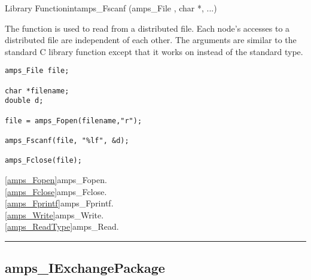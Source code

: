 \begin{deftypefn}{Library Function}{int}{amps\_Fscanf}
(amps_File , char *, ...)

\DESCRIPTION

The function  is used to read from a distributed file.
Each node's accesses to a distributed file are independent of each
other.  The arguments are similar to the standard C library function
 except that it works on  instead of the
standard  type.

\EXAMPLE

\begin{display}\begin{verbatim}
amps_File file;

char *filename;
double d;

file = amps_Fopen(filename,"r");

amps_Fscanf(file, "%lf", &d);

amps_Fclose(file);
\end{verbatim}\end{display}

\SEEALSO
\vref{amps_Fopen}{amps\_Fopen}. \\
\vref{amps_Fclose}{amps\_Fclose}. \\
\vref{amps_Fprintf}{amps\_Fprintf}. \\
\vref{amps_Write}{amps\_Write}. \\
\vref{amps_ReadType}{amps\_Read}. \\

\end{deftypefn}



\noindent\rule{\textwidth}{1mm}

\subsection{amps\_IExchangePackage}
\label{amps_IExchangePackage}


